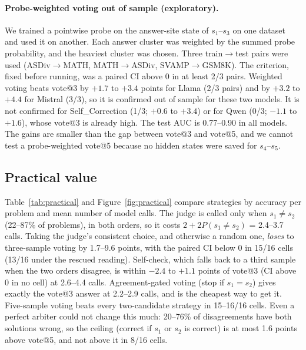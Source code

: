 \documentclass[11pt]{article}
\begin{document}
\paragraph{Probe-weighted voting out of sample (exploratory).} We trained a pointwise probe on the
answer-site state of $s_1$--$s_3$ on one dataset and used it on another. Each answer cluster was weighted by the
summed probe probability, and the heaviest cluster was chosen. Three train$\to$test pairs were used
(ASDiv$\to$MATH, MATH$\to$ASDiv, SVAMP$\to$GSM8K). The criterion, fixed before running, was a paired CI above
0 in at least 2/3 pairs. Weighted voting beats vote@3 by $+1.7$ to $+3.4$ points for Llama (2/3 pairs) and by
$+3.2$ to $+4.4$ for Mistral (3/3), so it is confirmed out of sample for these two models. It is not confirmed
for Self\_Correction (1/3; $+0.6$ to $+3.4$) or for Qwen (0/3; $-1.1$ to $+1.6$), whose vote@3 is already
high. The test AUC is 0.77--0.90 in all models. The gains are smaller than the gap between vote@3 and
vote@5, and we cannot test a probe-weighted vote@5 because no hidden states were saved for $s_4$--$s_5$.

\subsection{Practical value}
Table~\ref{tab:practical} and Figure~\ref{fig:practical} compare strategies by accuracy per problem and
mean number of model calls. The judge is called only when $s_1\neq s_2$ (22--87\% of problems), in both orders,
so it costs $2+2P(s_1\neq s_2)$ = 2.4--3.7 calls. Taking the judge's consistent choice, and otherwise a random
one, \emph{loses} to three-sample voting by 1.7--9.6 points, with the paired CI below 0 in 15/16 cells (13/16
under the rescued reading). Self-check, which falls back to a third sample when the two orders disagree, is
within $-2.4$ to $+1.1$ points of vote@3 (CI above 0 in no cell) at 2.6--4.4 calls. Agreement-gated voting
(stop if $s_1=s_2$) gives exactly the vote@3 answer at 2.2--2.9 calls, and is the cheapest way to get it.
Five-sample voting beats every two-candidate strategy in 15--16/16 cells. Even a perfect arbiter could not
change this much: 20--76\% of disagreements have both solutions wrong, so the ceiling (correct if $s_1$ or
$s_2$ is correct) is at most 1.6 points above vote@5, and not above it in 8/16 cells.

\begin{table}[t]
\centering\small
\caption{Accuracy (\%) per problem, project parser. Judge = consistent choice over both orders, otherwise
random; self-check = otherwise vote@3. Ceiling = $s_1$ or $s_2$ correct. Paired bootstrap CI. Exploratory.}
\label{tab:practical}
\resizebox{\linewidth}{!}{}
\end{table}
\end{document}
